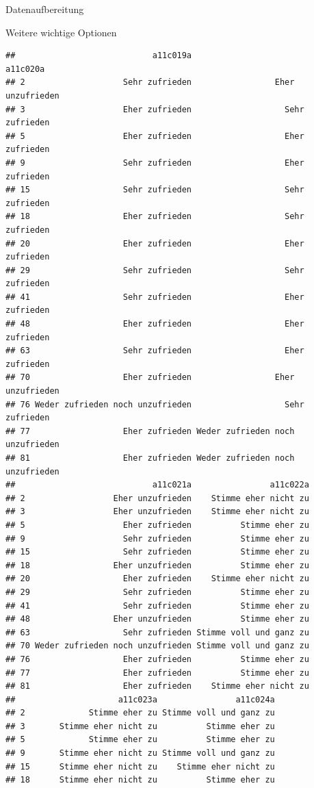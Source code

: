 \documentclass[ignorenonframetext,]{beamer}
\begin{document}
\begin{frame}[fragile]{Datenaufbereitung}
\begin{block}{Weitere wichtige Optionen}
\begin{verbatim}
##                            a11c019a                         a11c020a
## 2                    Sehr zufrieden                 Eher unzufrieden
## 3                    Eher zufrieden                   Sehr zufrieden
## 5                    Eher zufrieden                   Eher zufrieden
## 9                    Sehr zufrieden                   Eher zufrieden
## 15                   Sehr zufrieden                   Sehr zufrieden
## 18                   Eher zufrieden                   Sehr zufrieden
## 20                   Eher zufrieden                   Eher zufrieden
## 29                   Sehr zufrieden                   Sehr zufrieden
## 41                   Sehr zufrieden                   Eher zufrieden
## 48                   Eher zufrieden                   Eher zufrieden
## 63                   Sehr zufrieden                   Eher zufrieden
## 70                   Eher zufrieden                 Eher unzufrieden
## 76 Weder zufrieden noch unzufrieden                   Sehr zufrieden
## 77                   Eher zufrieden Weder zufrieden noch unzufrieden
## 81                   Eher zufrieden Weder zufrieden noch unzufrieden
##                            a11c021a                a11c022a
## 2                  Eher unzufrieden    Stimme eher nicht zu
## 3                  Eher unzufrieden    Stimme eher nicht zu
## 5                    Eher zufrieden          Stimme eher zu
## 9                    Sehr zufrieden          Stimme eher zu
## 15                   Sehr zufrieden          Stimme eher zu
## 18                 Eher unzufrieden          Stimme eher zu
## 20                   Eher zufrieden    Stimme eher nicht zu
## 29                   Sehr zufrieden          Stimme eher zu
## 41                   Sehr zufrieden          Stimme eher zu
## 48                 Eher unzufrieden          Stimme eher zu
## 63                   Sehr zufrieden Stimme voll und ganz zu
## 70 Weder zufrieden noch unzufrieden Stimme voll und ganz zu
## 76                   Eher zufrieden          Stimme eher zu
## 77                   Eher zufrieden          Stimme eher zu
## 81                   Eher zufrieden    Stimme eher nicht zu
##                     a11c023a                a11c024a
## 2             Stimme eher zu Stimme voll und ganz zu
## 3       Stimme eher nicht zu          Stimme eher zu
## 5             Stimme eher zu          Stimme eher zu
## 9       Stimme eher nicht zu Stimme voll und ganz zu
## 15      Stimme eher nicht zu    Stimme eher nicht zu
## 18      Stimme eher nicht zu          Stimme eher zu

\end{verbatim}
\end{block}
\end{frame}
\end{document}
